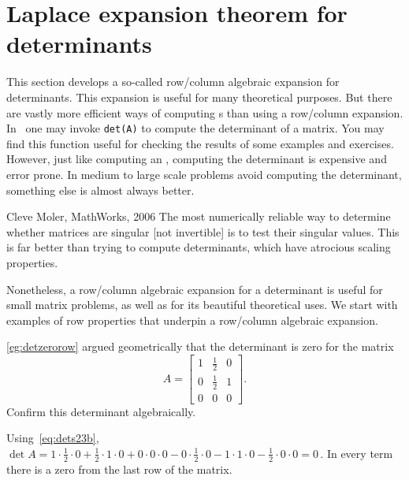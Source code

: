 

\section{Laplace expansion theorem for determinants}
\label{sec:apd}
\secttoc


This section develops a so-called row\slash column algebraic expansion for determinants. 
This expansion is useful for many theoretical purposes.
But there are vastly more efficient ways of computing s than using a row\slash column expansion.  
In \script\ one may invoke \verb|det(A)| to compute the determinant of a matrix.
You may find this function useful for checking the results of some examples and exercises.
However, just like computing an , computing the determinant is expensive and error prone.  
In medium to large scale problems avoid computing the determinant, something else is almost always better.

\begin{quoted}{Cleve Moler, MathWorks, 2006}
The most numerically reliable way to determine whether matrices are singular [not invertible] is to test their singular values. 
This is far better than trying to compute determinants, which have atrocious scaling properties.
\end{quoted}

Nonetheless, a row\slash column algebraic expansion for a determinant is useful for small matrix problems, as well as for its beautiful  theoretical uses.
We start with examples of row properties that underpin a row\slash column algebraic expansion.





\begin{example} \label{eg:detzerorowii}
\autoref{eg:detzerorow} argued geometrically that the determinant is zero for the matrix
\begin{equation*}
A=\begin{bmatrix} 1&\frac12&0
\\0&\frac12&1 \\0&0&0 \end{bmatrix}.
\end{equation*}
Confirm this determinant algebraically.
\begin{solution} 
Using~\eqref{eq:dets23b}, \(\det A
=1\cdot\frac12\cdot0+\frac12\cdot1\cdot0+0\cdot0\cdot0
-0\cdot\frac12\cdot0-1\cdot1\cdot0-\frac12\cdot0\cdot0
=0\)\,.  
In every term there is a zero from the last row of the matrix.
\end{solution}
\end{example}


